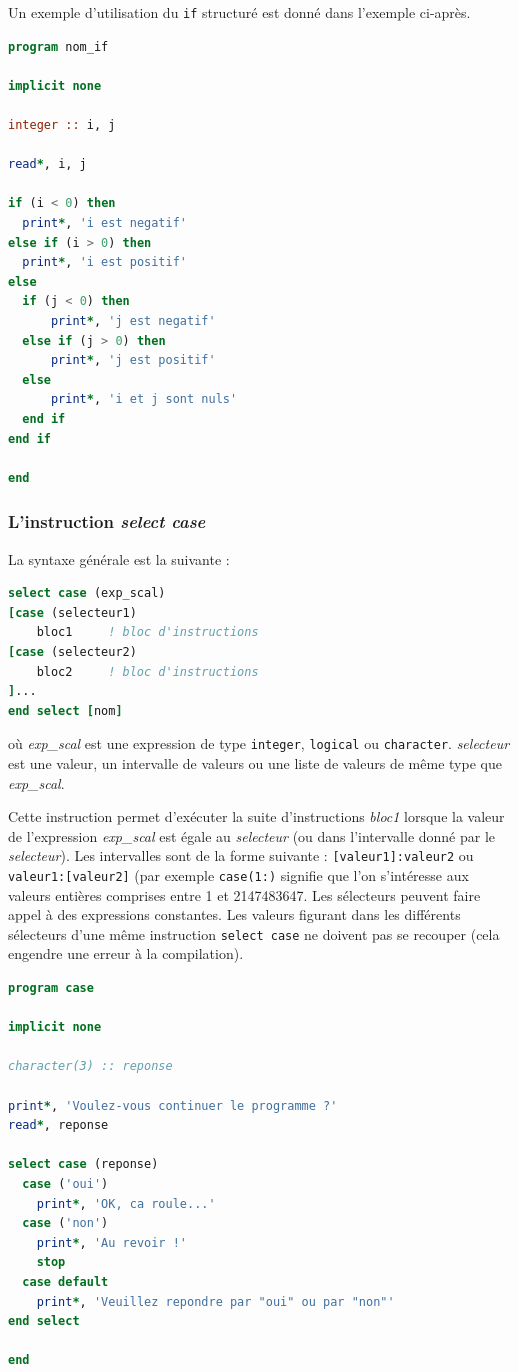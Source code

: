 \documentclass[a4paper,twoside]{article}
\begin{document}
Un exemple d'utilisation du \texttt{if} structuré est donné dans l'exemple ci-après. 
\begin{lstlisting}[language=Fortran]
program nom_if

implicit none

integer :: i, j

read*, i, j

if (i < 0) then
  print*, 'i est negatif'
else if (i > 0) then
  print*, 'i est positif'
else
  if (j < 0) then
      print*, 'j est negatif'
  else if (j > 0) then
      print*, 'j est positif'
  else
      print*, 'i et j sont nuls'
  end if
end if

end
\end{lstlisting}

\subsubsection{L'instruction \emph{select case}}

La syntaxe générale est la suivante : 
\begin{lstlisting}[language=Fortran]
select case (exp_scal) 
[case (selecteur1)
    bloc1     ! bloc d'instructions 
[case (selecteur2)
    bloc2     ! bloc d'instructions
]... 
end select [nom]
\end{lstlisting}
où \emph{exp\_scal} est une expression de type \texttt{integer}, \texttt{logical} ou \texttt{character}. \emph{selecteur} est une valeur, un intervalle de valeurs ou une liste de valeurs de même type que \emph{exp\_scal}.

Cette instruction permet d'exécuter la suite d'instructions \emph{bloc1} lorsque la valeur de l'expression \emph{exp\_scal} est égale au \emph{selecteur} (ou dans l'intervalle donné par le \emph{selecteur}). Les intervalles sont de la forme suivante : \texttt{[valeur1]:valeur2} ou \texttt{valeur1:[valeur2]} (par exemple \texttt{case(1:)} signifie que l'on s'intéresse aux valeurs entières comprises entre 1 et 2147483647. Les sélecteurs peuvent faire appel à des expressions constantes. Les valeurs figurant dans les différents sélecteurs d'une même instruction \texttt{select case} ne doivent pas se recouper (cela engendre une erreur à la compilation).

\begin{lstlisting}[language=Fortran]
program case

implicit none

character(3) :: reponse

print*, 'Voulez-vous continuer le programme ?'
read*, reponse

select case (reponse)
  case ('oui')
    print*, 'OK, ca roule...'
  case ('non')
    print*, 'Au revoir !'
    stop
  case default
    print*, 'Veuillez repondre par "oui" ou par "non"'
end select

end
\end{lstlisting}
\end{document}
